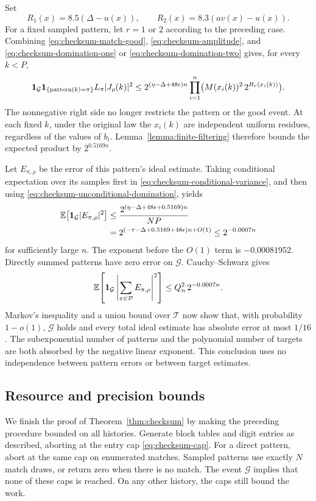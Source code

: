 Set
\[
 R_1(x)=8.5(\Delta-u(x)),\qquad
 R_2(x)=8.3(av(x)-u(x)).
\]
For a fixed sampled pattern, let $r=1$ or $2$ according to the preceding
case.  Combining \eqref{eq:checksum-match-good},
\eqref{eq:checksum-amplitude}, and
\eqref{eq:checksum-domination-one} or
\eqref{eq:checksum-domination-two} gives, for every $k<P$,
\begin{equation}
 \mathbf1_{\mathcal G}\mathbf1_{\{\text{pattern}(k)=\pi\}}
 L_\pi|J_\rho(k)|^2
 \le2^{(\eta-\Delta+48\epsilon)n}
       \prod_{i=1}^n\bigl(M(x_i(k))^2\,2^{R_r(x_i(k))}\bigr).
 \label{eq:checksum-unconditional-domination}
\end{equation}
The nonnegative right side no longer restricts the pattern or the good
event.  At each fixed $k$, under the original law the $x_i(k)$ are
independent uniform residues, regardless of the values of $b_i$.
Lemma~\ref{lemma:finite-filtering} therefore bounds the expected
product by $2^{0.5169n}$.

Let $E_{\pi,\rho}$ be the error of this pattern's ideal estimate.
Taking conditional expectation over its samples first in
\eqref{eq:checksum-conditional-variance}, and then using
\eqref{eq:checksum-unconditional-domination}, yields
\begin{align}
 \mathbb E\bigl[\mathbf1_{\mathcal G}|E_{\pi,\rho}|^2\bigr]
 &\le\frac{2^{(\eta-\Delta+48\epsilon+0.5169)n}}{NP}\notag\\
 &=2^{(-\tau-\Delta+0.5169+48\epsilon)n+O(1)}
 \le2^{-0.0007n}
 \label{eq:checksum-error-exponent}
\end{align}
for sufficiently large $n$.  The exponent before the $O(1)$ term is
$-0.00081952$.  Directly summed patterns have zero error on
$\mathcal G$.  Cauchy--Schwarz gives
\[
 \mathbb E\!\left[\mathbf1_{\mathcal G}
       \left|\sum_{\pi\in\mathcal P}E_{\pi,\rho}\right|^2\right]
 \le Q_n^2\,2^{-0.0007n}.
\]
Markov's inequality and a union bound over $\mathcal T$ now show that,
with probability $1-o(1)$, $\mathcal G$ holds and every total ideal
estimate has absolute error at most $1/16$.  The subexponential number
of patterns and the polynomial number of targets are both absorbed by
the negative linear exponent.  This conclusion uses no independence
between pattern errors or between target estimates.

\subsection{Resource and precision bounds}

We finish the proof of Theorem~\ref{thm:checksum} by making the
preceding procedure bounded on all histories.  Generate block tables
and digit entries as described, aborting at the entry cap
\eqref{eq:checksum-cap}.  For a direct pattern, abort at the same cap
on enumerated matches.  Sampled patterns use exactly $N$ match draws,
or return zero when there is no match.  The event $\mathcal G$ implies
that none of these caps is reached.  On any other history, the caps
still bound the work.

